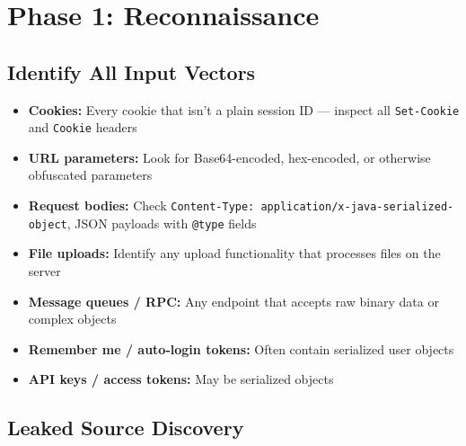 \documentclass[11pt]{article}
\begin{document}
\section{Phase 1: Reconnaissance}

\subsection{Identify All Input Vectors}

\begin{checklistbox}
\begin{itemize}
    \item[\checkmark] \textbf{Cookies:} Every cookie that isn't a plain session ID — inspect all \texttt{Set-Cookie} and \texttt{Cookie} headers
    \item[\checkmark] \textbf{URL parameters:} Look for Base64-encoded, hex-encoded, or otherwise obfuscated parameters
    \item[\checkmark] \textbf{Request bodies:} Check \texttt{Content-Type: application/x-java-serialized-object}, JSON payloads with \texttt{@type} fields
    \item[\checkmark] \textbf{File uploads:} Identify any upload functionality that processes files on the server
    \item[\checkmark] \textbf{Message queues / RPC:} Any endpoint that accepts raw binary data or complex objects
    \item[\checkmark] \textbf{Remember me / auto-login tokens:} Often contain serialized user objects
    \item[\checkmark] \textbf{API keys / access tokens:} May be serialized objects
\end{itemize}
\end{checklistbox}

\subsection{Leaked Source Discovery}
\end{document}
